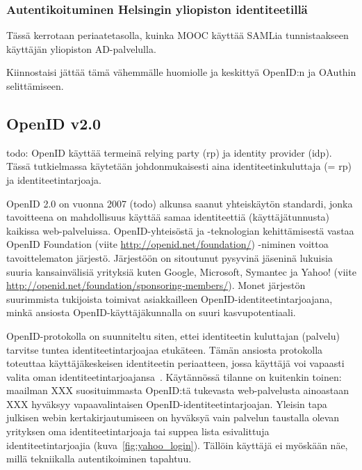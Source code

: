 \documentclass[finnish,gradu]{tktltiki}
\begin{document}


  \subsubsection{Autentikoituminen Helsingin yliopiston identiteetillä} %
  \label{sub:autentikoituminen_helsingin_yliopiston_käyttäjärekisteriin}
  Tässä kerrotaan periaatetasolla, kuinka MOOC käyttää SAMLia tunnistaakseen käyttäjän yliopiston AD-palvelulla.

  Kiinnostaisi jättää tämä vähemmälle huomiolle ja keskittyä OpenID:n ja OAuthin selittämiseen.




  \subsection{OpenID v2.0} %
  \label{sub:openid}

  todo: OpenID käyttää termeinä relying party (rp) ja identity provider (idp). Tässä tutkielmassa käytetään johdonmukaisesti aina identiteetinkuluttaja (= rp) ja identiteetintarjoaja.

  OpenID 2.0 on vuonna 2007 (todo) alkunsa saanut yhteiskäytön standardi, jonka tavoitteena on mahdollisuus käyttää samaa identiteettiä (käyttäjätunnusta) kaikissa web-palveluissa. OpenID-yhteisöstä ja -teknologian kehittämisestä vastaa OpenID Foundation (viite \url{http://openid.net/foundation/}) -niminen voittoa tavoittelematon järjestö. Järjestöön on sitoutunut pysyvinä jäseninä lukuisia suuria kansainvälisiä yrityksiä kuten Google, Microsoft, Symantec ja Yahoo! (viite \url{http://openid.net/foundation/sponsoring-members/}). Monet järjestön suurimmista tukijoista toimivat asiakkailleen OpenID-identiteetintarjoajana, minkä ansiosta OpenID-käyttäjäkunnalla on suuri kasvupotentiaali.

  OpenID-protokolla on suunniteltu siten, ettei identiteetin kuluttajan (palvelu) tarvitse tuntea identiteetintarjoajaa etukäteen. Tämän ansiosta protokolla toteuttaa käyttäjäkeskeisen identiteetin periaatteen, jossa käyttäjä voi vapaasti valita oman identiteetintarjoajansa~\cite{openid_recordon_2009}. Käytännössä tilanne on kuitenkin toinen: maailman XXX suosituimmasta OpenID:tä tukevasta web-palvelusta ainoastaan XXX hyväksyy vapaavalintaisen OpenID-identiteetintarjoajan. Yleisin tapa julkisen webin kertakirjautumiseen on hyväksyä vain palvelun taustalla olevan yrityksen oma identiteetintarjoaja tai suppea lista esivalittuja identiteetintarjoajia (kuva~\ref{fig:yahoo_login}). Tällöin käyttäjä ei myöskään näe, millä tekniikalla autentikoiminen tapahtuu.
\end{document}
